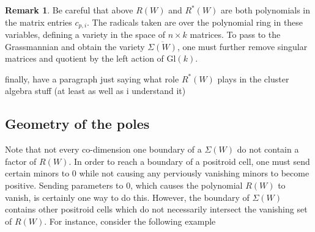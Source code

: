 \documentclass[11pt]{article}
\newtheorem{thm}{Theorem}[section]
\theoremstyle{remark}
\theoremstyle{definition}
\newtheorem{rmk}[thm]{Remark}
\begin{document}
\begin{rmk}
Be careful that above $R(W)$ and $R^{\ast}(W)$ are both polynomials in the matrix entries $c_{p,i}$. The radicals taken are over the polynomial ring in these variables, defining a variety in the space of $n \times k$ matrices. To pass to the Grassmannian and obtain the variety $\overline{\Sigma(W)}$, one must further remove singular matrices and quotient by the left action of $\mathrm{Gl}(k)$. 
\end{rmk}

{\color{red} finally, have a paragraph just saying what role $R^{\ast}(W)$ plays in the cluster algebra stuff (at least as well as i understand it)}


\subsection{Geometry of the poles}

Note that not every co-dimension one boundary of a $\Sigma(W)$ do not contain a factor of $R(W)$. In order to reach a boundary of a positroid cell, one must send certain minors to 0 while not causing any perviously vanishing minors to become positive. Sending parameters to $0$, which causes the polynomial $R(W)$ to vanish, is certainly one way to do this. However, the boundary of $\Sigma(W)$ contains other positroid cells which do not necessarily intersect the vanishing set of $R(W)$. For instance, consider the following example  
\end{document}
